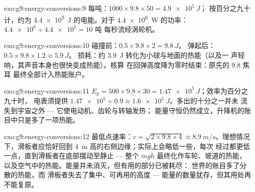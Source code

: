 \begin{solution}{exo:g9:energy-conversions:9}
每吨：$1000 \times 9.8 \times 50 = \qty{4.9e5}{J}$；
按百分之九十计，约为 \qty{4.4e5}{J} 的电能。对于
\qty{4.4e6}{W} 的功率：$\num{4.4e6} \div \num{4.4e5} = 10$ 吨
每秒流经涡轮机。
\end{solution}

\begin{solution}{exo:g9:energy-conversions:10}
碰撞前：$0.5 \times 9.8 \times 2 = \qty{9.8}{J}$。
弹起后：$0.5 \times 9.8 \times 1.2 \approx \qty{5.9}{J}$。
损耗：约 \qty{3.9}{J} 转化为小球与地面的热能（以及一
声轻响，其声音本身也很快变成热能）。核算
在回弹高度降为零时结束：原先的 $9.8$ 焦耳
最终全部计入热能账户。
\end{solution}

\begin{solution}{exo:g9:energy-conversions:11}
$E_p = 500 \times 9.8 \times 30 = \qty{1.47e5}{J}$；效率为百分之九十时，
电表须提供 $\num{1.47e5} \div 0.9 \approx
\qty{1.6e5}{J}$。多出的十分之一并未
流失到宇宙之外 --- 它使电动机、齿轮与转轴发热；
能量守恒仍然成立，升降机的账目中只是多了一项热能。
\end{solution}

\begin{solution}{exo:g9:energy-conversions:12}
最低点速率：$v = \sqrt{2 \times 9.8 \times 4} \approx
\qty{8.9}{m/s}$。理想情况下，滑板者应恰好回到
\qty{4}{m} 高的右侧边缘；实际上会略低一些，每次
经过都更低一点，直到滑板者在底部摆动至静止
--- 整个 $m g h$ 最终化作车轮、坡道的热能，
以及空气中的热能。能量并未消灭，但有用的部分已被耗尽：
世界的账目多了分散的热能，而
滑板者失去了集中、可再用的高度 ---
能量的数量犹存，但其用处再不能复原。
\end{solution}

